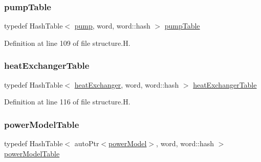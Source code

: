 \mbox{\label{classFoam_1_1structure_a3cad7e6a25055d05c668b06551d372c5}} 
\subsubsection{\texorpdfstring{pump\+Table}{pumpTable}}
{\footnotesize\ttfamily typedef Hash\+Table$<$ \hyperlink{classFoam_1_1pump}{pump}, word, word\+::hash $>$ \hyperlink{classFoam_1_1structure_a3cad7e6a25055d05c668b06551d372c5}{pump\+Table}\hspace{0.3cm}{\ttfamily [protected]}}



Definition at line 109 of file structure.\+H.

\mbox{\label{classFoam_1_1structure_a22ffcc3b5fb77bcb044a05e138ec4076}} 
\subsubsection{\texorpdfstring{heat\+Exchanger\+Table}{heatExchangerTable}}
{\footnotesize\ttfamily typedef Hash\+Table$<$ \hyperlink{classFoam_1_1heatExchanger}{heat\+Exchanger}, word, word\+::hash $>$ \hyperlink{classFoam_1_1structure_a22ffcc3b5fb77bcb044a05e138ec4076}{heat\+Exchanger\+Table}\hspace{0.3cm}{\ttfamily [protected]}}



Definition at line 116 of file structure.\+H.

\mbox{\label{classFoam_1_1structure_a5b1d82b72cd629a4695e6c44b37da7a7}} 
\subsubsection{\texorpdfstring{power\+Model\+Table}{powerModelTable}}
{\footnotesize\ttfamily typedef Hash\+Table$<$ auto\+Ptr$<$\hyperlink{classFoam_1_1powerModel}{power\+Model}$>$, word, word\+::hash $>$ \hyperlink{classFoam_1_1structure_a5b1d82b72cd629a4695e6c44b37da7a7}{power\+Model\+Table}\hspace{0.3cm}{\ttfamily [protected]}}



